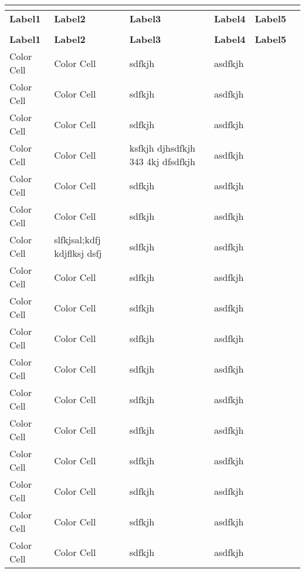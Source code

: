 \documentclass{article}
\begin{document}
\newpage
\renewcommand{\baselinestretch}{1.05}
\begin{center}
\LARGE
\keepXColumns
{}%
\begin{tabularx}{\textwidth}
{| Y@{} | s@{} | Y@{} | Y@{} | Y@{} | Y@{} |}
\\
\hline
\textbf{Label1} &\textbf{Label2} &\textbf{Label3} &\textbf{Label4} &\textbf{Label5}\\
\hline
\endfirsthead%
\\
\hline
\textbf{Label1} &\textbf{Label2} &\textbf{Label3} &\textbf{Label4} &\textbf{Label5}\\
\hline
\endhead%
Color Cell & Color Cell &sdfkjh  & asdfkjh & \\
\hline
Color Cell & Color Cell &sdfkjh  & asdfkjh & \\
\hline
Color Cell & Color Cell &sdfkjh  & asdfkjh & \\
\hline
Color Cell & Color Cell & ksfkjh djhsdfkjh 343 4kj dfsdfkjh  & asdfkjh & \\
\hline
Color Cell & Color Cell &sdfkjh  & asdfkjh & \\
\hline
Color Cell & Color Cell &sdfkjh  & asdfkjh & \\
\hline
Color Cell & slfkjsal;kdfj kdjflksj dsfj  &sdfkjh  & asdfkjh & \\
\hline
Color Cell & Color Cell &sdfkjh  & asdfkjh & \\
\hline
Color Cell & Color Cell &sdfkjh  & asdfkjh & \\
\hline
Color Cell & Color Cell &sdfkjh  & asdfkjh & \\
\hline
Color Cell & Color Cell &sdfkjh  & asdfkjh & \\
\hline
Color Cell & Color Cell &sdfkjh  & asdfkjh & \\
\hline
Color Cell & Color Cell &sdfkjh  & asdfkjh & \\
\hline
Color Cell & Color Cell &sdfkjh  & asdfkjh & \\
\hline
Color Cell & Color Cell &sdfkjh  & asdfkjh & \\
\hline
Color Cell & Color Cell &sdfkjh  & asdfkjh & \\
\hline
Color Cell & Color Cell &sdfkjh  & asdfkjh & \\

\end{tabularx}
\end{center}
\end{document}
